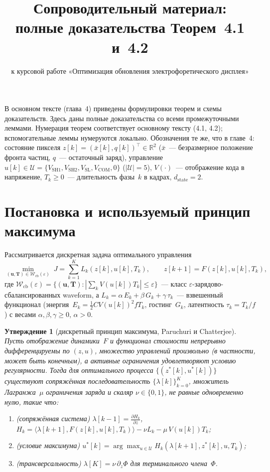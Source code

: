 \documentclass[12pt,a4paper]{article}
\title{Сопроводительный материал:\\полные доказательства Теорем~4.1 и~4.2}
\author{к курсовой работе «Оптимизация обновления электрофоретического дисплея»}
\date{}
\theoremstyle{plain}
\newtheorem{proposition}{Утверждение}
\theoremstyle{definition}\newtheorem{remark}{Замечание}
\newcommand{\Ueff}{\mathcal{U}}
\newcommand{\Wcb}{\mathcal{W}_{\mathrm{cb}}}
\newcommand{\dstate}{d_{\mathrm{state}}}
\newcommand{\xbar}{\bar{x}}
\begin{document}
\maketitle

В основном тексте (глава~4) приведены формулировки теорем и схемы доказательств.
Здесь даны полные доказательства со всеми промежуточными леммами. Нумерация
теорем соответствует основному тексту (4.1, 4.2); вспомогательные леммы
нумеруются локально. Обозначения те же, что в главе~4: состояние пикселя
$z[k]=(\xbar[k],q[k])^{\!\top}\in\mathbb R^{2}$ ($\xbar$~--- безразмерное
положение фронта частиц, $q$~--- остаточный заряд), управление
$u[k]\in\Ueff=\{V_{\mathrm{SH1}},V_{\mathrm{SH2}},V_{\mathrm{SL}},V_{\mathrm{COM}},0\}$
($|\Ueff|=5$), $V(\cdot)$~--- отображение кода в напряжение, $T_k\ge0$~---
длительность фазы~$k$ в кадрах, $\dstate=2$.


\section{Постановка и используемый принцип максимума}

Рассматривается дискретная задача оптимального управления
\begin{equation}\label{eq:problem}
  \min_{(\mathbf u,\mathbf T)\in\Wcb(\varepsilon)}\;
  J=\sum_{k=1}^{K} L_k(z[k],u[k],T_k),\qquad
  z[k+1]=F(z[k],u[k],T_k),
\end{equation}
где $\Wcb(\varepsilon)=\{(\mathbf u,\mathbf T):|\sum_k V(u[k])T_k|\le\varepsilon\}$~---
класс $\varepsilon$-зарядово-сбалансированных waveform, а
$L_k=\alpha\,E_k+\beta\,G_k+\gamma\,\tau_k$~--- взвешенный функционал
(энергия~$E_k=\tfrac12 C V(u[k])^2 f T_k$, гостинг~$G_k$, латентность
$\tau_k=T_k/f$) с весами $\alpha,\beta,\gamma\ge0$, $\alpha>0$.

\begin{proposition}[дискретный принцип максимума, Paruchuri и Chatterjee]
\label{prop:pmp}
Пусть отображение динамики~$F$ и функционал стоимости непрерывно дифференцируемы
по $(z,u)$, множество управлений произвольно (в частности, может быть конечным),
а активные ограничения удовлетворяют условию регулярности. Тогда для оптимального
процесса $\{(z^*[k],u^*[k])\}$ существуют сопряжённая последовательность
$\{\lambda[k]\}_{k=0}^{K}$, множитель Лагранжа~$\mu$ ограничения заряда и скаляр
$\nu\in\{0,1\}$, не равные одновременно нулю, такие что:
\begin{enumerate}[nosep]
  \item (сопряжённая система) $\displaystyle \lambda[k-1]=\frac{\partial H_k}{\partial z}$,
        $H_k=\langle\lambda[k+1],F(z[k],u[k],T_k)\rangle-\nu L_k-\mu\,V(u[k])T_k$;
  \item (условие максимума) $u^*[k]=\arg\max_{u\in\Ueff} H_k(\lambda[k+1],z^*[k],u,T_k)$;
  \item (трансверсальность) $\lambda[K]=\nu\,\partial_z\Phi$ для терминального члена~$\Phi$.
\end{enumerate}
\end{proposition}
\end{document}
